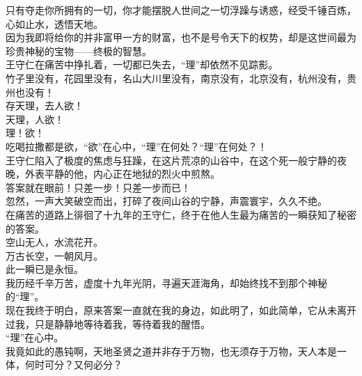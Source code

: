 \begin{multicols}{\theparacolNo}
只有夺走你所拥有的一切，你才能摆脱人世间之一切浮躁与诱惑，经受千锤百炼，心如止水，透悟天地。\\

因为我即将给你的并非富甲一方的财富，也不是号令天下的权势，却是这世间最为珍贵神秘的宝物——终极的智慧。\\

王守仁在痛苦中挣扎着，一切都已失去，“理”却依然不见踪影。\\

竹子里没有，花园里没有，名山大川里没有，南京没有，北京没有，杭州没有，贵州也没有！\\

存天理，去人欲！\\

天理，人欲！\\

理！欲！\\

吃喝拉撒都是欲，“欲”在心中，“理”在何处？“理”在何处？！\\

王守仁陷入了极度的焦虑与狂躁，在这片荒凉的山谷中，在这个死一般宁静的夜晚，外表平静的他，内心正在地狱的烈火中煎熬。\\

答案就在眼前！只差一步！只差一步而已！\\

忽然，一声大笑破空而出，打碎了夜间山谷的宁静，声震寰宇，久久不绝。\\

在痛苦的道路上徘徊了十九年的王守仁，终于在他人生最为痛苦的一瞬获知了秘密的答案。\\

空山无人，水流花开。\\

万古长空，一朝风月。\\

此一瞬已是永恒。\\

我历经千辛万苦，虚度十九年光阴，寻遍天涯海角，却始终找不到那个神秘的“理”。\\

现在我终于明白，原来答案一直就在我的身边，如此明了，如此简单，它从未离开过我，只是静静地等待着我，等待着我的醒悟。\\

“理”在心中。\\

我竟如此的愚钝啊，天地圣贤之道并非存于万物，也无须存于万物，天人本是一体，何时可分？又何必分？\\


\end{multicols}
